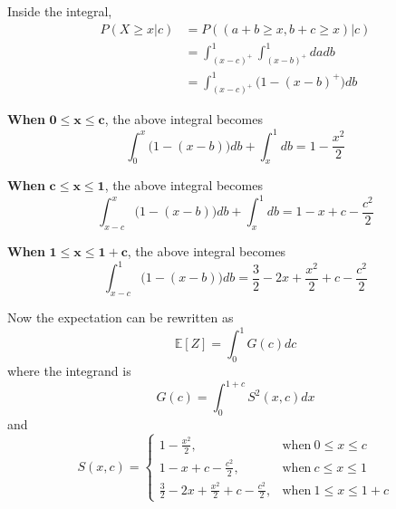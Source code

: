 \documentclass[12pt]{simple_doc}
\begin{document}
    Inside the integral,
    \begin{equation*}
        \begin{aligned}
        P(X \geqslant x | c) &= P((a + b \geqslant x, b + c \geqslant x)|c)\\
            &= \int_{(x-c)^+}^1 \int_{(x-b)^+}^1 da db\\
            &= \int_{(x-c)^+}^1 \big(1 - (x-b)^+\big) db
        \end{aligned}
    \end{equation*}

    \textbf{When} $\bm{0 \leqslant x \leqslant c}$, the above integral becomes
    \begin{equation*}
        \int_0^x \big(1 - (x-b)\big) db + \int_x^1 db = 1 - \frac{x^2}{2}
    \end{equation*}

    \textbf{When} $\bm{c \leqslant x \leqslant 1}$, the above integral becomes
    \begin{equation*}
        \int_{x-c}^x \big(1 - (x-b)\big) db + \int_x^1 db = 1 - x + c - \frac{c^2}{2}
    \end{equation*}

    \textbf{When} $\bm{1 \leqslant x \leqslant 1 + c}$, the above integral becomes
    \begin{equation*}
        \int_{x-c}^1 \big(1 - (x-b)\big) db = \frac{3}{2} - 2x + \frac{x^2}{2} + c - \frac{c^2}{2}
    \end{equation*}

    Now the expectation can be rewritten as
    \begin{equation*}
        \mathbb{E}[Z] = \int_0^1 G(c) dc
    \end{equation*}
    where the integrand is
    \begin{equation*}
        G(c) = \int_0^{1 + c} S^2(x, c) dx
    \end{equation*}
    and
    \begin{equation*}
        S(x, c) =
            \begin{cases}
              1 - \frac{x^2}{2}, & \text{when}\ 0 \leqslant x \leqslant c\\
              1 - x + c - \frac{c^2}{2}, & \text{when}\ c \leqslant x \leqslant 1\\
              \frac{3}{2} - 2x + \frac{x^2}{2} + c - \frac{c^2}{2}, & \text{when}\ 1 \leqslant x \leqslant 1 + c
            \end{cases}
    \end{equation*}
\end{document}
